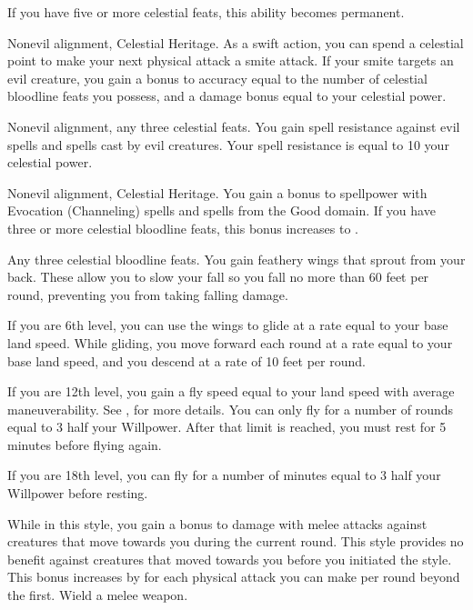 If you have five or more celestial feats, this ability becomes permanent.

\featpres Nonevil alignment, Celestial Heritage.
\featben As a swift action, you can spend a celestial point to make your next physical attack a smite attack.
If your smite targets an evil creature, you gain a bonus to accuracy equal to the number of celestial bloodline feats you possess, and a damage bonus equal to your celestial power.

\featpres Nonevil alignment, any three celestial feats.
\featben You gain spell resistance against evil spells and spells cast by evil creatures.
Your spell resistance is equal to 10 \add your celestial power.

\featpres Nonevil alignment, Celestial Heritage.
\featben You gain a  bonus to spellpower with Evocation (Channeling) spells and spells from the Good domain.
If you have three or more celestial bloodline feats, this bonus increases to .

\featpre Any three celestial bloodline feats.
\featben You gain feathery wings that sprout from your back.
These allow you to slow your fall so you fall no more than 60 feet per round, preventing you from taking falling damage.

If you are 6th level, you can use the wings to glide at a rate equal to your base land speed.
While gliding, you move forward each round at a rate equal to your base land speed, and you descend at a rate of 10 feet per round.

If you are 12th level, you gain a fly speed equal to your land speed with average maneuverability.
See , for more details.
You can only fly for a number of rounds equal to 3 \add half your Willpower.
After that limit is reached, you must rest for 5 minutes before flying again.

If you are 18th level, you can fly for a number of minutes equal to 3 \add half your Willpower before resting.

\featben While in this style, you gain a  bonus to damage with melee attacks against creatures that move towards you during the current round.
This style provides no benefit against creatures that moved towards you before you initiated the style.
This bonus increases by  for each physical attack you can make per round beyond the first.
\stylereq Wield a melee weapon.

